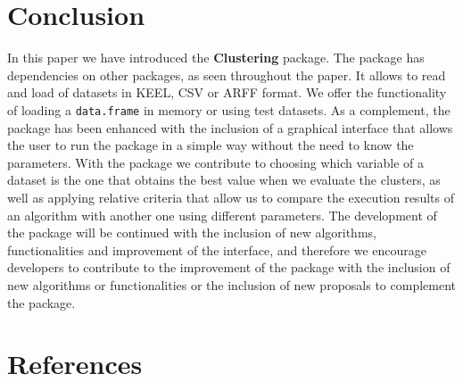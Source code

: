 \documentclass[
]{article}
\begin{document}
\hypertarget{conclusion}{%
\section{Conclusion}\label{conclusion}}

In this paper we have introduced the \textbf{Clustering} package. The
package has dependencies on other packages, as seen throughout the
paper. It allows to read and load of datasets in KEEL, CSV or ARFF
format. We offer the functionality of loading a \texttt{data.frame} in
memory or using test datasets. As a complement, the package has been
enhanced with the inclusion of a graphical interface that allows the
user to run the package in a simple way without the need to know the
parameters. With the package we contribute to choosing which variable of
a dataset is the one that obtains the best value when we evaluate the
clusters, as well as applying relative criteria that allow us to compare
the execution results of an algorithm with another one using different
parameters. The development of the package will be continued with the
inclusion of new algorithms, functionalities and improvement of the
interface, and therefore we encourage developers to contribute to the
improvement of the package with the inclusion of new algorithms or
functionalities or the inclusion of new proposals to complement the
package.

\hypertarget{references}{%
\section*{References}\label{references}}
\end{document}
